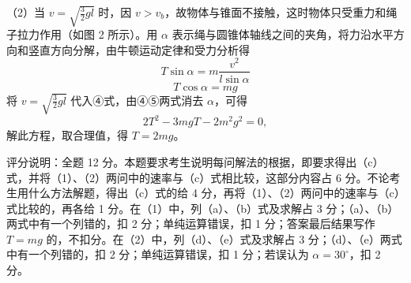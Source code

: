 \documentclass[\gkver]{gaokaozhenti}
\begin{document}
\begin{enumerate}
{（2）当 $v = \sqrt{\frac{3}{2}gl}$ 时，因 $v > v_{b}$，故物体与锥面不接触，这时物体只受重力和绳子拉力作用（如图 2 所示）。用 $\alpha$ 表示绳与圆锥体轴线之间的夹角，将力沿水平方向和竖直方向分解，由牛顿运动定律和受力分析得
\[ T\sin\alpha = m\frac{v^{2}}{l\sin\alpha} \tag{④} \]
\[ T\cos\alpha = mg \tag{⑤} \]
将 $v = \sqrt{\frac{3}{2}gl}$ 代入④式，由④⑤两式消去 $\alpha$，可得
\[ 2T^{2}-3mgT-2m^{2}g^{2}=0, \]
解此方程，取合理值，得 $T=2mg$。

评分说明：全题 12 分。本题要求考生说明每问解法的根据，即要求得出（c）式，并将（1）、（2）两问中的速率与（c）式相比较，这部分内容占 6 分。不论考生用什么方法解题，得出（c）式的给 4 分，再将（1）、（2）两问中的速率与（c）式比较的，再各给 1 分。在（1）中，列（a）、（b）式及求解占 3 分；（a）、（b）两式中有一个列错的，扣 2 分；单纯运算错误，扣 1 分；答案最后结果写作 $T = mg$ 的，不扣分。在（2）中，列（d）、（e）式及求解占 3 分；（d）、（e）两式中有一个列错的，扣 2 分；单纯运算错误，扣 1 分；若误认为 $\alpha=30^{\circ}$，扣 2 分。
}

\end{enumerate}
\end{document}
